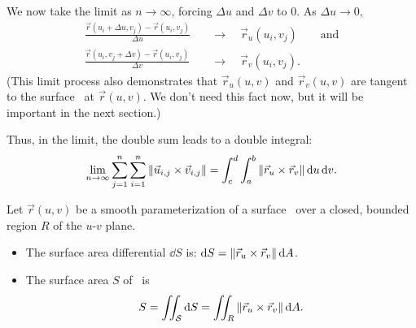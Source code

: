We now take the limit as $n\to\infty$, forcing $\Delta u$ and $\Delta v$ to 0. As $\Delta u\to 0$,
\begin{align*}
\frac{\vec r(u_i+\Delta u,v_j) - \vec r(u_i,v_j)}{\Delta u}\quad
&\to\quad \vec r_u(u_i,v_j)\qquad \text{and}\\
\frac{\vec r(u_i,v_j+\Delta v)-\vec r(u_i,v_j)}{\Delta v}\quad
&\to\quad \vec r_v(u_i,v_j).
\end{align*}
(This limit process also demonstrates that $\vec r_u(u,v)$ and $\vec r_v(u,v)$ are tangent to the surface \surfaceS\ at $\vec r(u,v)$. We don't need this fact now, but it will be important in the next section.)

Thus, in the limit, the double sum leads to a double integral:
\[
\lim_{n\to\infty} \sum_{j=1}^n\sum_{i=1}^n \left\lVert \vec u_{i,j}\times \vec v_{i,j} \right\rVert
= \int_c^d\int_a^b \left\lVert \vec r_u\times\vec r_v \right\rVert\operatorname{d}\! u\operatorname{d}\! v.
\]

\begin{theorem}\label{thm:par_surface_area}%
Let $\vec r(u,v)$ be a smooth parameterization of a surface \surfaceS\ over a closed, bounded region $R$ of the $u$-$v$ plane. 
\begin{itemize}
\item	The surface area differential $\dd S$ is: $\operatorname{d}\! S = \left\lVert \vec r_u\times \vec r_v \right\rVert\operatorname{d}\! A$.
\item The surface area $S$ of \surfaceS\ is
\[S = \iint_{\mathcal{S}}\operatorname{d}\! S = \iint_R \left\lVert \vec r_u\times \vec r_v \right\rVert\operatorname{d}\! A.\]
\end{itemize}
\end{theorem}


